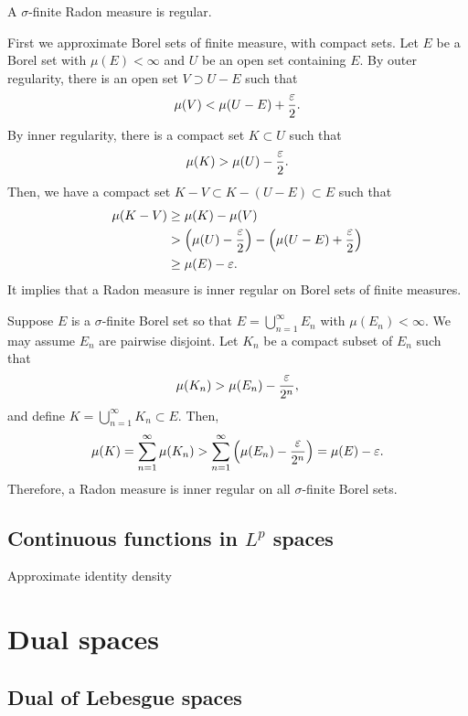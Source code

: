 \documentclass{../../large}
\begin{document}
\begin{prop}
A $\sigma$-finite Radon measure is regular.
\end{prop}
\begin{pf}
First we approximate Borel sets of finite measure, with compact sets.
Let $E$ be a Borel set with $\mu(E)<\infty$ and $U$ be an open set containing $E$.
By outer regularity, there is an open set $V\supset U-E$ such that
\[\mu(V)<\mu(U-E)+\frac{\varepsilon}2.\]
By inner regularity, there is a compact set $K\subset U$ such that
\[\mu(K)>\mu(U)-\frac{\varepsilon}2.\]
Then, we have a compact set $K-V\subset K-(U-E)\subset E$ such that
\begin{align*}
\mu(K-V)&\ge\mu(K)-\mu(V)\\
&>\left(\mu(U)-\frac{\varepsilon}2\right)-\left(\mu(U-E)+\frac{\varepsilon}2\right)\\
&\ge\mu(E)-\varepsilon.
\end{align*}
It implies that a Radon measure is inner regular on Borel sets of finite measures.

Suppose $E$ is a $\sigma$-finite Borel set so that $E=\bigcup_{n=1}^\infty E_n$ with $\mu(E_n)<\infty$.
We may assume $E_n$ are pairwise disjoint.
Let $K_n$ be a compact subset of $E_n$ such that
\[\mu(K_n)>\mu(E_n)-\frac{\varepsilon}{2^n},\]
and define $K=\bigcup_{n=1}^\infty K_n\subset E$.
Then,
\[\mu(K)=\sum_{n=1}^\infty\mu(K_n)>\sum_{n=1}^\infty\left(\mu(E_n)-\frac{\varepsilon}{2^n}\right)=\mu(E)-\varepsilon.\]
Therefore, a Radon measure is inner regular on all $\sigma$-finite Borel sets.
\end{pf}

\section{Continuous functions in $L^p$ spaces}

Approximate identity
density












\chapter{Dual spaces}


\section{Dual of Lebesgue spaces}
\end{document}
